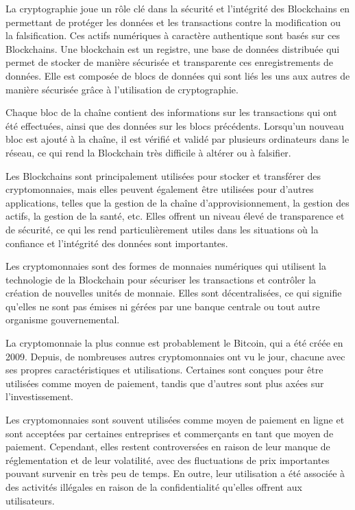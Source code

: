 La cryptographie joue un rôle clé dans la sécurité et l'intégrité des Blockchains en permettant de protéger les données et les transactions contre la modification ou la falsification.
Ces actifs numériques à caractère authentique sont basés sur ces Blockchains. Une blockchain est un registre, une base de données distribuée qui permet de stocker de manière sécurisée et transparente ces enregistrements de données. Elle est composée de blocs de données qui sont liés les uns aux autres de manière sécurisée grâce à l'utilisation de cryptographie.

Chaque bloc de la chaîne contient des informations sur les transactions qui ont été effectuées, ainsi que des données sur les blocs précédents. Lorsqu'un nouveau bloc est ajouté à la chaîne, il est vérifié et validé par plusieurs ordinateurs dans le réseau, ce qui rend la Blockchain très difficile à altérer ou à falsifier.

Les Blockchains sont principalement utilisées pour stocker et transférer des cryptomonnaies, mais elles peuvent également être utilisées pour d'autres applications, telles que la gestion de la chaîne d'approvisionnement, la gestion des actifs, la gestion de la santé, etc. Elles offrent un niveau élevé de transparence et de sécurité, ce qui les rend particulièrement utiles dans les situations où la confiance et l'intégrité des données sont importantes.

Les cryptomonnaies sont des formes de monnaies numériques qui utilisent la technologie de la Blockchain pour sécuriser les transactions et contrôler la création de nouvelles unités de monnaie. Elles sont décentralisées, ce qui signifie qu'elles ne sont pas émises ni gérées par une banque centrale ou tout autre organisme gouvernemental.

La cryptomonnaie la plus connue est probablement le Bitcoin, qui a été créée en 2009. Depuis, de nombreuses autres cryptomonnaies ont vu le jour, chacune avec ses propres caractéristiques et utilisations. Certaines sont conçues pour être utilisées comme moyen de paiement, tandis que d'autres sont plus axées sur l'investissement.

Les cryptomonnaies sont souvent utilisées comme moyen de paiement en ligne et sont acceptées par certaines entreprises et commerçants en tant que moyen de paiement. Cependant, elles restent controversées en raison de leur manque de réglementation et de leur volatilité, avec des fluctuations de prix importantes pouvant survenir en très peu de temps. En outre, leur utilisation a été associée à des activités illégales en raison de la confidentialité qu'elles offrent aux utilisateurs.

